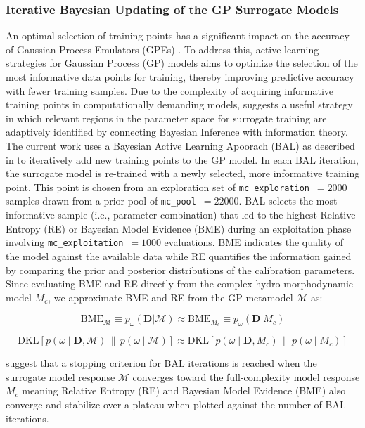 \documentclass[draft,linenumbers,onecolumn]{agujournal2019} %
\begin{document}
\subsubsection{Iterative Bayesian Updating of the GP Surrogate Models}

An optimal selection of training points has a significant impact on the accuracy of Gaussian Process Emulators (GPEs) \cite{sinsbeck2017sequential}. To address this, active learning strategies for Gaussian Process (GP) models aims to optimize the selection of the most informative data points for training, thereby improving predictive accuracy with fewer training samples. Due to the complexity of acquiring informative training points in computationally demanding models,  suggests a useful strategy in which relevant regions in the parameter space for surrogate training are adaptively identified by connecting Bayesian Inference with information theory. The current work uses a Bayesian Active Learning Apoorach (BAL) as described in  to iteratively add new training points to the GP model. In each BAL iteration, the surrogate model is re-trained with a newly selected, more informative training point. This point is chosen from an exploration set of \texttt{mc\_exploration}~$= 2000$ samples drawn from a prior pool of \texttt{mc\_pool}~$= 22000$. BAL selects the most informative sample (i.e., parameter combination) that led to the highest Relative Entropy (RE) or Bayesian Model Evidence (BME) during an exploitation phase involving \texttt{mc\_exploitation}~$= 1000$ evaluations. BME indicates the quality of the model against the available data while RE quantifies the information gained by comparing the prior and posterior distributions of the calibration parameters. Since evaluating BME and RE directly from the complex hydro-morphodynamic model \( M_c \), we approximate BME and RE from the GP metamodel \( \mathcal{M} \) as:

\[
\text{BME}_{\mathcal{M}} \equiv p_{\omega}(\mathbf{D}|\mathcal{M}) \approx \text{BME}_{M_c} \equiv p_{\omega}(\mathbf{D}|M_c)
\]

\[
\text{DKL}\left[ p(\omega \mid \mathbf{D}, \mathcal{M}) \,\|\, p(\omega \mid \mathcal{M}) \right] \approx \text{DKL}\left[ p(\omega \mid \mathbf{D}, M_c) \,\|\, p(\omega \mid M_c) \right]
\]

 suggest that a stopping criterion for BAL iterations is reached when the surrogate model response $\mathcal{M}$ converges toward the full-complexity model response $M_c$ meaning Relative Entropy (RE) and Bayesian Model Evidence (BME) also converge and stabilize over a plateau when plotted against the number of BAL iterations.
\end{document}
